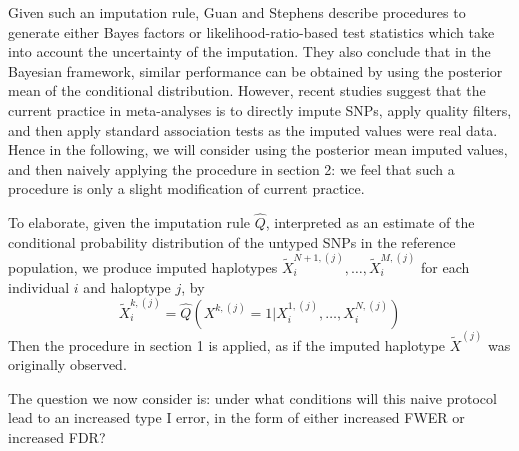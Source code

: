 \documentclass[12pt]{article}
\begin{document}
Given such an imputation rule, Guan and Stephens \cite{Guan2008}
describe procedures to generate either Bayes factors or
likelihood-ratio-based test statistics which take into account
the uncertainty of the imputation.
They also conclude that in the Bayesian framework,
similar performance can be obtained by
using the posterior mean of the conditional distribution.
However, recent studies \cite{Dupuis2010}\cite{Levy2009}
suggest that the current practice in meta-analyses
is to directly impute SNPs, apply quality filters,
and then apply standard association tests
as the imputed values were real data.
Hence in the following, we will consider using the posterior mean imputed
values,
and then naively applying the procedure in section 2:
we feel that such a procedure is only a slight modification of current
practice.

To elaborate, given the imputation rule $\hat{Q}$, interpreted
as an estimate of the conditional probability distribution
of the untyped SNPs in the reference population,
we produce imputed haplotypes
$\tilde{X}^{N+1,(j)}_i,\hdots,\tilde{X}^{M,(j)}_i$
for each individual $i$ and haloptype $j$,
by
\[
\tilde{X}^{k,(j)}_i = \hat{Q}(X^{k,(j)}=1|X^{1,(j)}_i,\hdots,X^{N,(j)}_i)
\]
Then the procedure in section 1 is applied, as if the imputed
haplotype
$\tilde{X}^{(j)}$ was originally observed.

The question we now consider is: under what conditions
will this naive protocol lead to an increased type I error,
in the form of either increased FWER or increased FDR?
\end{document}
